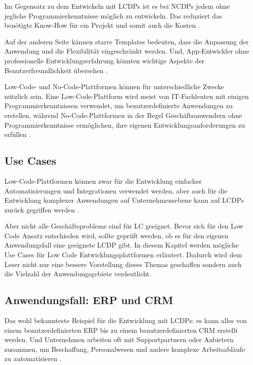 \documentclass[12pt]{article} %
\begin{document}
	Im Gegensatz zu dem Entwickeln mit LCDPs ist es bei NCDPs jedem ohne jegliche Programmierkenntnisse möglich zu entwickeln. Das reduziert das benötigte Know-How für ein Projekt und somit auch die Kosten \cite{Microsoft.2023}. \newline
	
	Auf der anderen Seite kännen starre Templates bedeuten, dass die Anpassung der Anwendung und die Flexibilität eingeschränkt werden.
	Und, App-Entwickler ohne professionelle Entwicklungserfahrung könnten wichtige Aspekte der Benutzerfreundlichkeit übersehen \cite{Microsoft.2023}. \newline	
	
	Low-Code- und No-Code-Plattformen können für unterschiedliche Zwecke nützlich sein. Eine Low-Code-Plattform wird meist von IT-Fachleuten mit einigen Programmierkenntnissen verwendet, um benutzerdefinierte Anwendungen zu erstellen, während No-Code-Plattformen in der Regel Geschäftsanwendern ohne Programmierkenntnisse ermöglichen, ihre eigenen Entwicklungsanforderungen zu erfüllen \cite{Microsoft.2023}. 

	\subsection{Use Cases}	
	Low-Code-Plattformen können zwar für die Entwicklung einfacher Automatisierungen und Integrationen verwendet werden, aber auch für die Entwicklung komplexer Anwendungen auf Unternehmensebene kann auf LCDPs zurück gegriffen werden \cite{KevinShuler.2023}. 
	
	Aber nicht alle Geschäftsprobleme sind für LC geeignet. Bevor sich für den Low Code Ansatz entschieden wird, sollte geprüft werden, ob es für den eigenen Anwendungsfall eine geeignete LCDP gibt. In diesem Kapitel werden mögliche Use Cases für Low Code Entwicklungsplattformen erläutert. Dadurch wird dem Leser nicht nur eine bessere Vorstellung dieses Themas geschaffen sondern auch die Vielzahl der Anwendungsgebiete verdeutlicht.

	\subsection{Anwendungsfall: ERP und CRM}
	Das wohl bekannteste Beispiel für die Entwicklung mit LCDPs: es kann alles von einem benutzerdefinierten ERP bis zu einem benutzerdefinierten CRM erstellt werden. Und Unternehmen arbeiten oft mit Supportpartnern oder Anbietern zusammen, um Beschaffung, Personalwesen und andere komplexe Arbeitsabläufe zu automatisieren \cite{KevinShuler.2023}.
	
\end{document}
